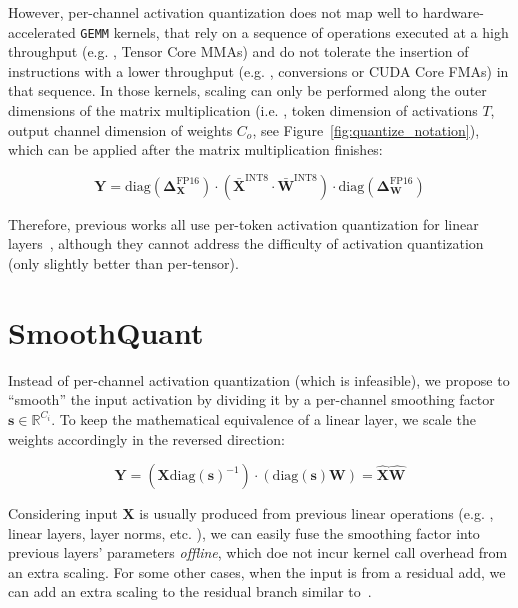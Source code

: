 However, per-channel activation quantization does not map well to hardware-accelerated \texttt{GEMM} kernels, that rely on a sequence of operations executed at a high throughput (e.g. , Tensor Core MMAs) and do not tolerate the insertion of instructions with a lower throughput (e.g. , conversions or CUDA Core FMAs) in that sequence. In those kernels, scaling can only be performed along the outer dimensions of the matrix multiplication (i.e. , token dimension of activations $T$, output channel dimension of weights $C_o$, see Figure~\ref{fig:quantize_notation}), which can be applied after the matrix multiplication finishes:

\begin{equation}
    \mathbf{Y} = \text{diag}(\mathbf{\Delta}_{\mathbf{X}}^{\text{FP16}}) \cdot (\mathbf{\bar{X}}^{\text{INT8}}\cdot \mathbf{\bar{W}}^{\text{INT8}}) \cdot \text{diag}(\mathbf{\Delta}_{\mathbf{W}}^{\text{FP16}})
\end{equation}

Therefore, previous works all use per-token activation quantization for linear layers~\cite{dettmers2022llmint8, zeroquant}, although they cannot address the difficulty of activation quantization (only slightly better than per-tensor).

\section{SmoothQuant}
Instead of per-channel activation quantization (which is infeasible), we propose to ``smooth'' the input activation by dividing it by a per-channel smoothing factor $\mathbf{s}\in\mathbb{R}^{C_i}$. To keep the mathematical equivalence of a linear layer, we scale the weights accordingly in the reversed direction:

\begin{equation}
    \mathbf{Y} = (\mathbf{X}\text{diag}(\mathbf{s})^{-1}) \cdot(\text{diag}(\mathbf{s})\mathbf{W}) = \hat{\mathbf{X}} \hat{\mathbf{W}}
\end{equation}

Considering input $\mathbf{X}$ is usually produced from previous linear operations (e.g. , linear layers, layer norms, etc. ), we can easily fuse the smoothing factor into previous layers' parameters \textit{offline}, which doe not incur kernel call overhead from an extra scaling. For some other cases, when the input is from a residual add, we can add an extra scaling to the residual branch similar to~\citet{outlier_suppression}.

